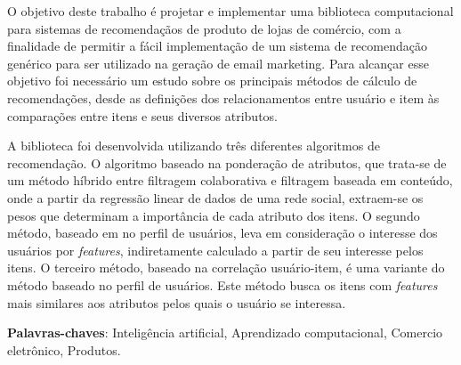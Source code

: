 \setlength{\absparsep}{18pt} %
\begin{resumo}
O objetivo deste trabalho é projetar e implementar uma biblioteca computacional para sistemas de recomendaçãos de produto de lojas de comércio, com a finalidade de permitir a fácil implementação de um sistema de recomendação genérico para ser utilizado na geração de email marketing. Para alcançar esse objetivo foi necessário um estudo sobre os principais métodos de cálculo de recomendações, desde as definições dos relacionamentos entre usuário e item às comparações entre itens e seus diversos atributos.

A biblioteca foi desenvolvida utilizando três diferentes algoritmos de recomendação. O algoritmo baseado na ponderação de atributos, que trata-se de um método híbrido entre filtragem colaborativa e filtragem baseada em conteúdo, onde a partir da
regressão linear de dados de uma rede social, extraem-se os pesos que determinam a importância de cada atributo dos itens. O segundo método, baseado em no perfil de usuários, leva em consideração o interesse dos usuários por \textit{features}, indiretamente calculado a partir de seu interesse pelos itens. O terceiro método, baseado na correlação usuário-item, é uma variante do método baseado no perfil de usuários. Este método busca os itens com \textit{features} mais similares aos atributos pelos quais o usuário se interessa.


 \textbf{Palavras-chaves}: Inteligência artificial, Aprendizado computacional, Comercio eletrônico, Produtos.
\end{resumo}